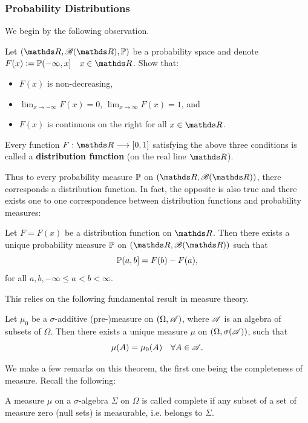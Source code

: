 \subsubsection{Probability Distributions}
We begin by the following observation.
\begin{exercise}
Let $(\R, \B(\R), \p)$ be a probability space and denote $F(x) := \p(-\infty, x]\quad x \in \R$. Show that:
\begin{itemize}
    \item $F(x)$ is non-decreasing,
    \item $\lim_{x\rightarrow -\infty} F(x) = 0$, $\lim_{x \rightarrow \infty} F(x) = 1$, and
    \item $F(x)$ is continuous on the right for all $x \in \R$.
\end{itemize}
\end{exercise}


\begin{definition}
Every function $F: \R \longrightarrow [0,1]$ satisfying the above three conditions is called a \textbf{distribution function} (on  the real line $\R$).
\end{definition}

Thus to every probability measure $\mathbb{P}$ on $(\R, \B(\R))$, there corresponds a distribution function. In fact, the opposite is also true and there exists one to one correspondence between distribution functions and probability measures:
\begin{theorem}
Let $F = F(x)$ be a distribution function on $\R$. Then there exists a unique probability measure $\mathbb{P}$ on $(\R, \B(\R))$ such that $$\mathbb{P}(a, b] = F(b) - F(a),$$
for all $a,b, -\infty \le a < b < \infty.$
\end{theorem}

This relies on the following fundamental result in measure theory.
\begin{theorem}
Let $\mu_0$ be a $\sigma$-additive (pre-)measure on $(\Omega, \mathcal{A})$, where $\mathcal{A}$ is an algebra of subsets of $\Omega$. Then there exists a unique measure $\mu$ on $(\Omega, \sigma(\mathcal{A}))$, such that 
\begin{equation*}
    \mu (A) = \mu_0(A) \quad \forall A \in \mathcal{A}.
\end{equation*}
\end{theorem}

We make a few remarks on this theorem, the first one being the completeness of measure. Recall the following:
\begin{definition}
A measure $\mu$ on a $\sigma$-algebra $\Sigma$ on $\Omega$ is called complete if any subset of a set of measure zero (null sets) is measurable, i.e. belongs to $\Sigma$.
\end{definition}

